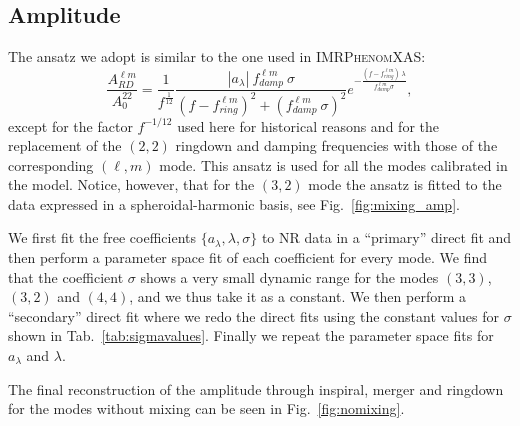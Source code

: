 \documentclass[twocolumn,prd,aps,superscriptaddress,preprintnumbers,tightenlines,showpacs,nofootinbib,eqsecnum,amsfonts,amsmath]{revtex4}
\newcommand{\phX}{\textsc{IMRPhenomXAS}\xspace}
\begin{document}
\subsection{Amplitude} \label{sec:ring_amp}
The ansatz we adopt is similar to the one used in \phX:
\begin{equation} \label{eq:ringdown_ansatz}
\frac{A_{RD}^{\ell m}}{A_0^{22}}= \frac{1}{f^{\frac{1}{12}}} \frac{|a_\lambda| \: f^{\ell m}_{damp}\:\sigma}{\left(f-f^{\ell m}_{ring}\right)^2+\left(f^{\ell m}_{damp}\:\sigma\right)^2}e^{-\frac{ \left(f-f^{\ell m}_{ring}\right)\:\lambda}{f^{\ell m}_{damp}\sigma}},
\end{equation}
except for the factor $f^{-1/12}$ used here for historical reasons and for the replacement of the $(2,2)$ ringdown and damping frequencies with those of the corresponding $(\ell,m)$ mode. This ansatz is used for all the modes calibrated in the model. Notice, however, that for the $(3,2)$ mode the ansatz is fitted to the data expressed in a spheroidal-harmonic basis, see Fig.~\ref{fig:mixing_amp}.

We first fit the free coefficients $\{a_{\lambda},\lambda,\sigma\}$ to NR data in a ``primary'' direct fit and then perform a parameter space fit of each coefficient for every mode. We find that the coefficient $\sigma$ shows a very small dynamic range for the modes $(3,3)$, $(3,2)$ and $(4,4)$, and
we thus take it as a constant. We then perform a ``secondary'' direct fit where we redo the direct fits using the constant values for $\sigma$ shown in Tab.~\ref{tab:sigmavalues}. Finally we repeat the parameter space fits for $a_{\lambda}$ and $\lambda$.

The final reconstruction of the amplitude through inspiral, merger and ringdown for the modes without mixing can be seen in Fig.~\ref{fig:nomixing}.
\end{document}
